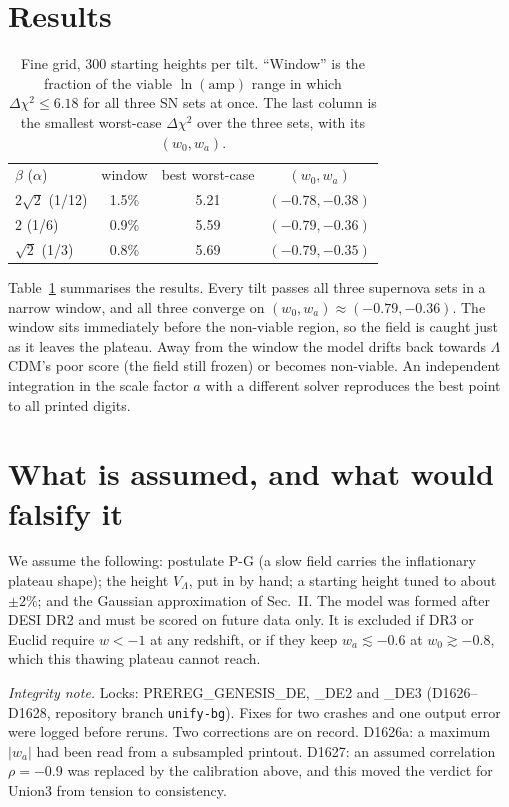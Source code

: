 \documentclass[aps,prd,twocolumn,superscriptaddress,nofootinbib,showkeys]{revtex4-2}
\begin{document}
\section{Results}
\begin{table}[b]\caption{Fine grid, 300 starting heights per tilt. ``Window'' is the fraction of the viable $\ln(\mathrm{amp})$ range in which $\Delta\chi^2\le6.18$ for all three SN sets at once. The last column is the smallest worst-case $\Delta\chi^2$ over the three sets, with its $(w_0,w_a)$.}\label{tab:t}
\begin{ruledtabular}\begin{tabular}{lccc}
$\beta$ ($\alpha$) & window & best worst-case & $(w_0,w_a)$\\
$2\sqrt2$ (1/12) & 1.5\% & 5.21 & $(-0.78,-0.38)$\\
$2$ (1/6) & 0.9\% & 5.59 & $(-0.79,-0.36)$\\
$\sqrt2$ (1/3) & 0.8\% & 5.69 & $(-0.79,-0.35)$\\
\end{tabular}\end{ruledtabular}\end{table}
Table~\ref{tab:t} summarises the results. Every tilt passes all three supernova sets in a narrow window, and all three converge on $(w_0,w_a)\approx(-0.79,-0.36)$. The window sits immediately before the non-viable region, so the field is caught just as it leaves the plateau. Away from the window the model drifts back towards $\Lambda$CDM's poor score (the field still frozen) or becomes non-viable. An independent integration in the scale factor $a$ with a different solver reproduces the best point to all printed digits.

\section{What is assumed, and what would falsify it}
We assume the following: postulate P-G (a slow field carries the inflationary plateau shape); the height $V_\Lambda$, put in by hand; a starting height tuned to about $\pm2\%$; and the Gaussian approximation of Sec.~II. The model was formed after DESI DR2 and must be scored on future data only. It is excluded if DR3 or Euclid require $w<-1$ at any redshift, or if they keep $w_a\lesssim-0.6$ at $w_0\gtrsim-0.8$, which this thawing plateau cannot reach.

\emph{Integrity note.} Locks: PREREG\_GENESIS\_DE, \_DE2 and \_DE3 (D1626--D1628, repository branch \texttt{unify-bg}). Fixes for two crashes and one output error were logged before reruns. Two corrections are on record. D1626a: a maximum $|w_a|$ had been read from a subsampled printout. D1627: an assumed correlation $\rho=-0.9$ was replaced by the calibration above, and this moved the verdict for Union3 from tension to consistency.
\end{document}
